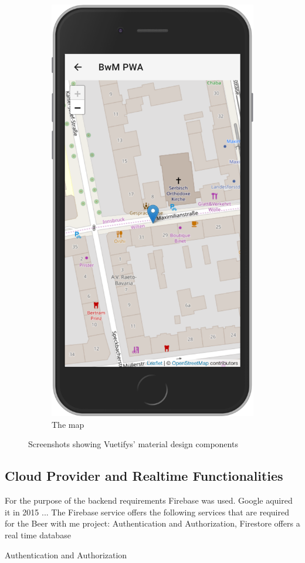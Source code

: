 \begin{figure}
\begin{subfigure}{.5\textwidth}
    \includegraphics[width=.7\linewidth]{img/screen03}
    \caption{The map}
    \label{fig:sub2}
  \end{subfigure}
  \caption{Screenshots showing Vuetifys' material design components}
  \label{fig:test}
\end{figure}


\subsection{Cloud Provider and Realtime Functionalities}

For the purpose of the backend requirements Firebase was used. Google aquired it in 2015 ...
The Firebase service offers the following services that are required for the Beer with me project: Authentication and Authorization, Firestore offers a real time database

Authentication and Authorization

